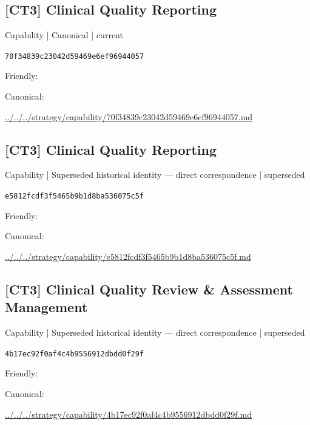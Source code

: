 \documentclass[10pt,a4paper]{article}
\begin{document}
\subsection*{[CT3] Clinical Quality Reporting}
{\small Capability | Canonical | current}\par
\texttt{70f34839c23042d59469e6ef96944057}\par
Friendly: \par
Canonical: \par
{\footnotesize\url{../../../strategy/capability/70f34839c23042d59469e6ef96944057.md}}\par
\subsection*{[CT3] Clinical Quality Reporting}
{\small Capability | Superseded historical identity — direct correspondence | superseded}\par
\texttt{e5812fcdf3f5465b9b1d8ba536075c5f}\par
Friendly: \par
Canonical: \par
{\footnotesize\url{../../../strategy/capability/e5812fcdf3f5465b9b1d8ba536075c5f.md}}\par
\subsection*{[CT3] Clinical Quality Review \& Assessment Management}
{\small Capability | Superseded historical identity — direct correspondence | superseded}\par
\texttt{4b17ec92f0af4c4b9556912dbdd0f29f}\par
Friendly: \par
Canonical: \par
{\footnotesize\url{../../../strategy/capability/4b17ec92f0af4c4b9556912dbdd0f29f.md}}\par
\end{document}
